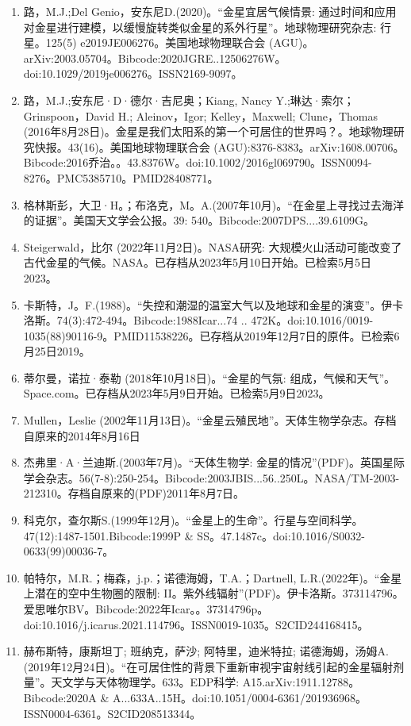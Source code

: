 \begin{enumerate}
\item 路，M.J.;Del Genio，安东尼D.(2020)。“金星宜居气候情景: 通过时间和应用对金星进行建模，以缓慢旋转类似金星的系外行星”。地球物理研究杂志: 行星。125(5) e2019JE006276。美国地球物理联合会 (AGU)。arXiv:2003.05704。Bibcode:2020JGRE..12506276W。doi:10.1029/2019je006276。ISSN2169-9097。 
\item 路，M.J.;安东尼·D·德尔·吉尼奥；Kiang, Nancy Y.;琳达·索尔；Grinspoon，David H.; Aleinov，Igor; Kelley，Maxwell; Clune，Thomas (2016年8月28日)。金星是我们太阳系的第一个可居住的世界吗？。地球物理研究快报。43(16)。美国地球物理联合会 (AGU):8376-8383。arXiv:1608.00706。Bibcode:2016乔治。。43.8376W。doi:10.1002/2016gl069790。ISSN0094-8276。PMC5385710。PMID28408771。   
\item 格林斯彭，大卫·H。；布洛克，M。A.(2007年10月)。“在金星上寻找过去海洋的证据”。美国天文学会公报。39: 540。Bibcode:2007DPS....39.6109G。
\item Steigerwald，比尔 (2022年11月2日)。NASA研究: 大规模火山活动可能改变了古代金星的气候。NASA。已存档从2023年5月10日开始。已检索5月5日2023。
\item 卡斯特，J。F.(1988)。“失控和潮湿的温室大气以及地球和金星的演变”。伊卡洛斯。74(3):472-494。Bibcode:1988Icar...74 .. 472K。doi:10.1016/0019-1035(88)90116-9。PMID11538226。已存档从2019年12月7日的原件。已检索6月25日2019。 
\item 蒂尔曼，诺拉·泰勒 (2018年10月18日)。“金星的气氛: 组成，气候和天气”。Space.com。已存档从2023年5月9日开始。已检索5月9日2023。
\item Mullen，Leslie (2002年11月13日)。“金星云殖民地”。天体生物学杂志。存档自原来的2014年8月16日
\item 杰弗里·A·兰迪斯.(2003年7月)。“天体生物学: 金星的情况”(PDF)。英国星际学会杂志。56(7-8):250-254。Bibcode:2003JBIS...56..250L。NASA/TM-2003-212310。存档自原来的(PDF)2011年8月7日。
\item 科克尔，查尔斯S.(1999年12月)。“金星上的生命”。行星与空间科学。47(12):1487-1501.Bibcode:1999P & SS。47.1487c。doi:10.1016/S0032-0633(99)00036-7。
\item 帕特尔，M.R.；梅森，j.p.；诺德海姆，T.A.；Dartnell, L.R.(2022年)。“金星上潜在的空中生物圈的限制: II。紫外线辐射”(PDF)。伊卡洛斯。373114796。爱思唯尔BV。Bibcode:2022年Icar。。37314796p。doi:10.1016/j.icarus.2021.114796。ISSN0019-1035。S2CID244168415。   
\item 赫布斯特，康斯坦丁; 班纳克，萨沙; 阿特里，迪米特拉; 诺德海姆，汤姆A.(2019年12月24日)。“在可居住性的背景下重新审视宇宙射线引起的金星辐射剂量”。天文学与天体物理学。633。EDP科学: A15.arXiv:1911.12788。Bibcode:2020A & A...633A..15H。doi:10.1051/0004-6361/201936968。ISSN0004-6361。S2CID208513344。  

\end{enumerate}
